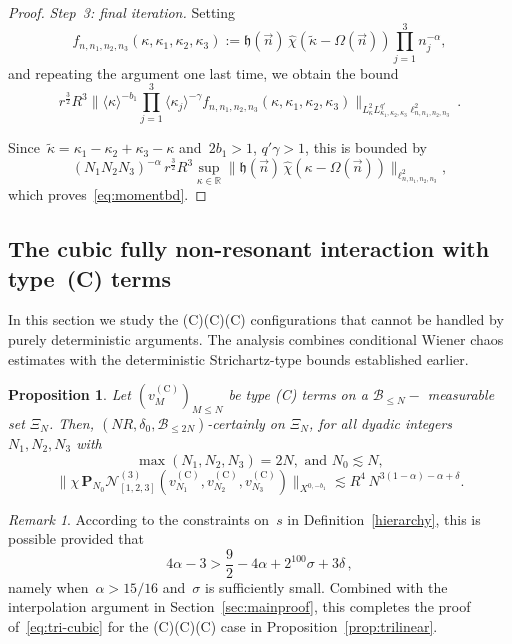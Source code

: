 \documentclass[11pt,reqno,english]{amsart}
\numberwithin{equation}{section}
\theoremstyle{plain}
\newtheorem{proposition}[theorem]{Proposition}
\theoremstyle{definition}
\theoremstyle{remark}
\newtheorem{remark}[theorem]{Remark}
\newcommand{\R}{\mathbb{R}}
\begin{document}
\begin{proof}
	\emph{Step~3: final iteration.}
	Setting
	\[
	f_{n,n_1,n_2,n_3}(\kappa,\kappa_{1},\kappa_{2},\kappa_{3})
	:=
	\mathfrak{h}(\vec n)\,
	\widehat{\chi}(\widetilde{\kappa}-\Omega(\vec{n}))
	\prod_{j=1}^3n_j^{-\alpha},
	\]
	and repeating the argument one last time, we obtain the bound
	\[
	r^{\frac32}R^3
	\big\|
	\langle\kappa\rangle^{-b_1}
	\prod_{j=1}^3\langle\kappa_j\rangle^{-\gamma}
	f_{n,n_1,n_2,n_3}(\kappa,\kappa_{1},\kappa_{2},\kappa_{3})
	\big\|_{L_\kappa^2L_{\kappa_1,\kappa_2,\kappa_3}^{q'}\ell_{n,n_1,n_2,n_3}^2}.
	\]

	Since~$\widetilde{\kappa}=\kappa_1-\kappa_2+\kappa_3-\kappa$ and~$2b_{1}>1$, $q'\gamma>1$, this is bounded by
	\[
	(N_1N_2N_3)^{-\alpha}\,r^{\frac32}R^3
	\sup_{\kappa\in\R}
	\big\|
	\mathfrak{h}(\vec n)\,
	\widehat{\chi}(\kappa-\Omega(\vec{n}))
	\big\|_{\ell_{n,n_1,n_2,n_3}^2},
	\]
	which proves~\eqref{eq:momentbd}.
\end{proof}


\subsection{The cubic fully non-resonant interaction with type~(C) terms}
\label{CCC}

In this section we study the (C)(C)(C) configurations that cannot be handled by purely deterministic arguments. The analysis combines conditional Wiener chaos estimates with the deterministic Strichartz-type bounds established earlier.
\begin{proposition}\label{prop:CCC}
	Let $(v_M^{(\mathrm{C})})_{M\leq N}$ be type (C) terms on a $\mathcal{B}_{\leq N}-$ measurable set $\Xi_N$. Then, $(NR,\delta_{0},\mathcal{B}_{\leq 2N})$-certainly on $\Xi_N$, for all dyadic integers~$N_{1},N_{2},N_{3}$ with $$ \max(N_{1},N_{2},N_{3})=2N,\text{ and } N_{0}\lesssim N,$$
	\[
	\big\|
	\chi\,\mathbf{P}_{N_{0}}
	\mathcal{N}_{[1,2,3]}^{(3)}(v^{(\mathrm{C})}_{N_{1}},
v^{(\mathrm{C})}_{N_{2}},v^{(\mathrm{C})}_{N_{3}})
	\big\|_{X^{0,-b_{1}}}
	\lesssim R^{4}
	\,
	N^{3(1-\alpha)-\alpha+\delta}.
	\]
\end{proposition}

\begin{remark}\label{rmk:numerology}
	According to the constraints on~$s$ in Definition~\ref{hierarchy}, this is possible provided that
	\[
	4\alpha - 3> \frac{9}{2}-4\alpha +2^{100}\sigma + 3\delta\,,
	\]
	namely when~$\alpha>15/16$ and~$\sigma$ is sufficiently small. Combined with the interpolation argument in Section~\ref{sec:mainproof}, this completes the proof of~\eqref{eq:tri-cubic} for the (C)(C)(C) case in Proposition~\ref{prop:trilinear}.
\end{remark}
\end{document}
